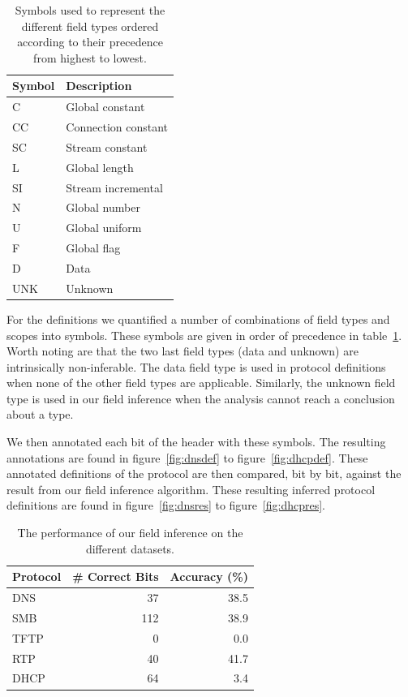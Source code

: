 \documentclass[a4paper]{report}
\begin{document}
\begin{table}[h]
    \centering
    \captionsetup{width=0.8\textwidth}
    \caption{Symbols used to represent the different field types ordered
    according to their precedence from highest to lowest.}
    \begin{tabular}{| l | l |}
        \hline
        \textbf{Symbol}&\textbf{Description} \\ \hline
        C   & Global constant \\ \hline
        CC  & Connection constant \\ \hline
        SC  & Stream constant \\ \hline
        L   & Global length \\ \hline
        SI  & Stream incremental \\ \hline
        N   & Global number \\ \hline
        U   & Global uniform \\ \hline
        F   & Global flag \\ \hline
        D   & Data \\ \hline
        UNK & Unknown \\ \hline
    \end{tabular}
    \label{tab:symbols}
\end{table}

For the definitions we quantified a number of combinations of field types and
scopes into symbols. These symbols are given in order of precedence in
table~\ref{tab:symbols}. Worth noting are that the two last field types (data
and unknown) are intrinsically non-inferable. The data field type is used in
protocol definitions when none of the other field types are applicable.
Similarly, the unknown field type is used in our field inference when the
analysis cannot reach a conclusion about a type.

We then annotated each bit of the header with these symbols. The resulting
annotations are found in figure~\ref{fig:dnsdef} to figure~\ref{fig:dhcpdef}.
These annotated definitions of the protocol are then compared, bit by bit,
against the result from our field inference algorithm. These resulting inferred
protocol definitions are found in figure~\ref{fig:dnsres} to
figure~\ref{fig:dhcpres}.

\begin{table}[h]
    \centering
    \captionsetup{width=0.8\textwidth}
    \caption{The performance of our field inference on the different datasets.}
    \begin{tabular}{| l | r | r |}
        \hline
        \textbf{Protocol}&\textbf{\# Correct Bits}&\textbf{Accuracy (\%)} \\ \hline
        DNS & 37 & 38.5 \\ \hline
        SMB & 112 & 38.9 \\ \hline
        TFTP & 0 & 0.0 \\ \hline
        RTP & 40 & 41.7 \\ \hline
        DHCP & 64 & 3.4 \\ \hline
    \end{tabular}
    \label{tab:accuracy}
\end{table}
\end{document}
